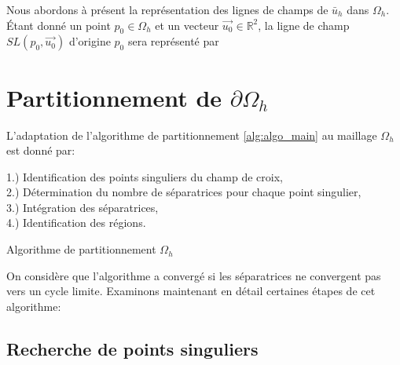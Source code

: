 Nous abordons à présent la représentation des lignes de champs de $\bar{u}_h$ dans $\Omega_h$. \'Etant donné un point $p_0\in\Omega_h$ et un vecteur $\overrightarrow{u_0}\in\mathbb{R}^2$, la ligne de champ $SL(p_0, \overrightarrow{u_0})$ d'origine $p_0$ sera représenté par 

\section{Partitionnement de $\partial\Omega_h$}

L'adaptation de l'algorithme de partitionnement \ref{alg:algo_main} au maillage $\Omega_h$ est donné par:\\

\begin{algorithm}[H]
\label{alg:discr_algo_main}
\vspace{0.2cm}
1.) Identification des points singuliers du champ de croix,\\\vspace{0.2cm}
2.) Détermination du nombre de séparatrices pour chaque point singulier,\\\vspace{0.2cm}
3.) Intégration des séparatrices,\\\vspace{0.2cm}
4.) Identification des régions.\\\vspace{0.2cm}
\caption{Algorithme de partitionnement $\Omega_h$}
\end{algorithm}
\vspace{0.5cm}
On considère que l'algorithme a convergé si les séparatrices ne convergent pas vers un cycle limite. Examinons maintenant en détail certaines étapes de cet algorithme:

\subsection{Recherche de points singuliers}

